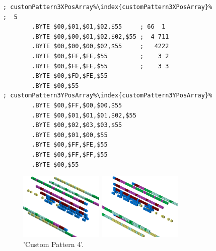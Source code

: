 \begin{minipage}[b]{0.46\linewidth}
\begin{lrbox}{\mybox}%
\begin{lstlisting}[basicstyle=\ttfamily\tiny,escapechar=\%]
; customPattern3XPosArray%\index{customPattern3XPosArray}%             ;  5    
        .BYTE $00,$01,$01,$02,$55     ; 66  1 
        .BYTE $00,$00,$01,$02,$02,$55 ;  4 711
        .BYTE $00,$00,$00,$02,$55     ;   4222
        .BYTE $00,$FF,$FE,$55         ;    3 2
        .BYTE $00,$FE,$FE,$55         ;    3 3
        .BYTE $00,$FD,$FE,$55
        .BYTE $00,$55
; customPattern3YPosArray%\index{customPattern3YPosArray}%
        .BYTE $00,$FF,$00,$00,$55
        .BYTE $00,$01,$01,$01,$02,$55
        .BYTE $00,$02,$03,$03,$55
        .BYTE $00,$01,$00,$55
        .BYTE $00,$FF,$FE,$55
        .BYTE $00,$FF,$FF,$55
        .BYTE $00,$55
\end{lstlisting}
\end{lrbox}%
\scalebox{0.8}{\usebox{\mybox}}

\end{minipage}
\begin{minipage}[b]{0.54\linewidth}
\begin{figure}[H]
    \centering
    \begin{adjustbox}{width=6cm,margin=0cm 0cm}
      \includegraphics[width=4cm]{src/patterns/pattern12-45.png}%
    \end{adjustbox}
    \begin{adjustbox}{width=6cm,margin=0cm -1.8cm}
      \includegraphics[width=4cm]{src/patterns/pattern12-225.png}%
    \end{adjustbox}
\caption{'Custom Pattern 4'.}
\end{figure}
\end{minipage}

